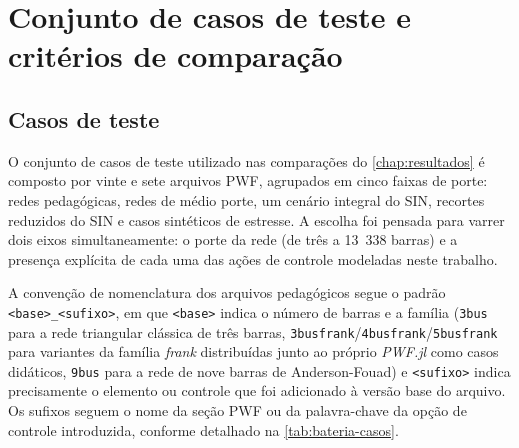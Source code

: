 \section{Conjunto de casos de teste e critérios de comparação}
\label{sec:bateria-casos}

\subsection{Casos de teste}
\label{subsec:casos-teste}

O conjunto de casos de teste utilizado nas comparações do \autoref{chap:resultados} é composto por vinte e sete arquivos PWF, agrupados em cinco faixas de porte: redes pedagógicas, redes de médio porte, um cenário integral do SIN, recortes reduzidos do SIN e casos sintéticos de estresse. A escolha foi pensada para varrer dois eixos simultaneamente: o porte da rede (de três a 13~338 barras) e a presença explícita de cada uma das ações de controle modeladas neste trabalho.

A convenção de nomenclatura dos arquivos pedagógicos segue o padrão \texttt{<base>\allowbreak\_<sufixo>}, em que \texttt{<base>} indica o número de barras e a família (\texttt{3bus} para a rede triangular clássica de três barras, \texttt{3busfrank}/\allowbreak \texttt{4busfrank}/\allowbreak \texttt{5busfrank} para variantes da família \textit{frank} distribuídas junto ao próprio \textit{PWF.jl} como casos didáticos, \texttt{9bus} para a rede de nove barras de Anderson-Fouad) e \texttt{<sufixo>} indica precisamente o elemento ou controle que foi adicionado à versão base do arquivo. Os sufixos seguem o nome da seção PWF ou da palavra-chave da opção de controle introduzida, conforme detalhado na \autoref{tab:bateria-casos}.

